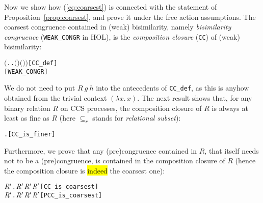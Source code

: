 Now we show how (\ref{eq:coarsest}) is connected with
the statement of Proposition~\ref{prop:coarsest}, and prove it under
the free action assumptions.
%
The coarsest congruence
contained in (weak) bisimilarity, namely \emph{bisimilarity
  congruence} (\texttt{WEAK_CONGR} in HOL), is
the \emph{composition closure} (\texttt{CC}) of (weak) bisimilarity:
\begin{alltt}
     \HOLTokenDefEquality{} \ensuremath{(}\HOLTokenLambda{} . \HOLSymConst{\HOLTokenForall{}}.   \HOLSymConst{\HOLTokenImp{}}  \ensuremath{(} \ensuremath{)} \ensuremath{(} \ensuremath{)}\ensuremath{)}\hfill{[CC_def]}
    \HOLTokenDefEquality{}  \hfill{[WEAK_CONGR]}
\end{alltt}
We do not need to put $R\ g\ h$ into the antecedents of
  \texttt{CC\_def}, as this is anyhow obtained from the trivial context $(\lambda x.\,x)$.
The next result shows that, for any binary relation $R$ 
on CCS processes, the composition closure of $R$ is always at least as
fine as $R$ (here $\subseteq_r$ stands for \emph{relational subset}):
\begin{alltt}
\HOLTokenTurnstile{} \HOLSymConst{\HOLTokenForall{}}.   \HOLSymConst{\HOLTokenRSubset{}} \hfill{[CC_is_finer]}
\end{alltt}
Furthermore, we prove that any (pre)congruence contained in $R$,
that itself needs not to be a (pre)congruence,
is contained in the composition closure of $R$
(hence the composition closure is \hl{indeed} the coarsest one):
\begin{alltt}
\HOLTokenTurnstile{} \HOLSymConst{\HOLTokenForall{}} \ensuremath{\HOLBoundVar{R}\sp{\prime}}.  \ensuremath{\HOLBoundVar{R}\sp{\prime}} \HOLSymConst{\HOLTokenConj{}} \ensuremath{\HOLBoundVar{R}\sp{\prime}} \HOLSymConst{\HOLTokenRSubset{}}  \HOLSymConst{\HOLTokenImp{}} \ensuremath{\HOLBoundVar{R}\sp{\prime}} \HOLSymConst{\HOLTokenRSubset{}}  \hfill{[CC_is_coarsest]}
\HOLTokenTurnstile{} \HOLSymConst{\HOLTokenForall{}} \ensuremath{\HOLBoundVar{R}\sp{\prime}}.  \ensuremath{\HOLBoundVar{R}\sp{\prime}} \HOLSymConst{\HOLTokenConj{}} \ensuremath{\HOLBoundVar{R}\sp{\prime}} \HOLSymConst{\HOLTokenRSubset{}}  \HOLSymConst{\HOLTokenImp{}} \ensuremath{\HOLBoundVar{R}\sp{\prime}} \HOLSymConst{\HOLTokenRSubset{}}  \hfill{[PCC_is_coarsest]}
\end{alltt}

